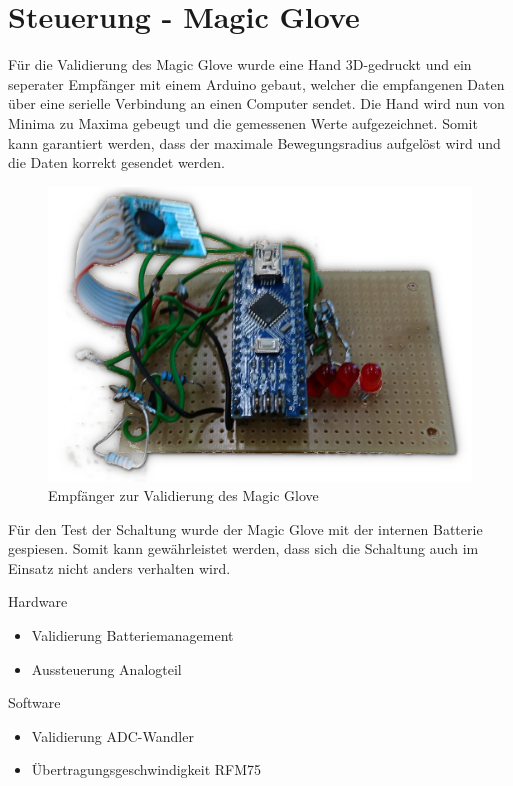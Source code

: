 \section{Steuerung - Magic Glove} \label{ValidSteuerMagicGlove}
Für die Validierung des Magic Glove wurde eine Hand 3D-gedruckt und ein seperater Empfänger mit einem Arduino gebaut, welcher die empfangenen Daten über eine serielle Verbindung an einen Computer sendet. Die Hand wird nun von Minima zu Maxima gebeugt und die gemessenen Werte aufgezeichnet. Somit kann garantiert werden, dass der maximale Bewegungsradius aufgelöst wird und die Daten korrekt gesendet werden.
\begin{figure} [H]
	\centering
	\includegraphics[scale=0.2]{images/receiver}
	\caption{Empfänger zur Validierung des Magic Glove}
	\label{fig:statediagrammbatteri}
\end{figure}
Für den Test der Schaltung wurde der Magic Glove mit der internen Batterie gespiesen. Somit kann gewährleistet werden, dass sich die Schaltung auch im Einsatz nicht anders verhalten wird.

Hardware
\begin{itemize}
	\item Validierung Batteriemanagement
	\item Aussteuerung Analogteil
\end{itemize}
Software
\begin{itemize}
	\item Validierung ADC-Wandler
	\item Übertragungsgeschwindigkeit RFM75
\end{itemize}


